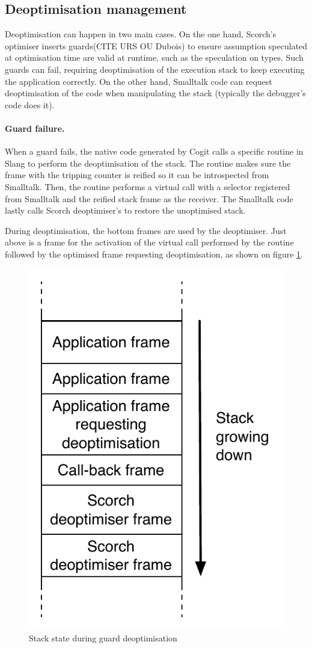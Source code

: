 \documentclass[a4paper,12pt,twoside]{../includes/ThesisStyle}
\begin{document}
\subsection{Deoptimisation management}

Deoptimisation can happen in two main cases. On the one hand, Scorch's optimiser inserts guards(CITE URS OU Dubois) to ensure assumption speculated at optimisation time are valid at runtime, such as the speculation on types. Such guards can fail, requiring deoptimisation of the execution stack to keep executing the application correctly. On the other hand, Smalltalk code can request deoptimisation of the code when manipulating the stack (typically the debugger's code does it).

\paragraph{Guard failure.} When a guard fails, the native code generated by Cogit calls a specific routine in Slang to perform the deoptimisation of the stack. The routine makes sure the frame with the tripping counter is reified so it can be introspected from Smalltalk. Then, the routine performs a virtual call with a selector registered from Smalltalk and the reified stack frame as the receiver. The Smalltalk code lastly calls Scorch deoptimiser's to restore the unoptimised stack.

During deoptimisation, the bottom frames are used by the deoptimiser. Just above is a frame for the activation of the virtual call performed by the routine followed by the optimised frame requesting deoptimisation, as shown on figure \ref{fig:DeoptCallBackStack}.

\begin{figure}[h!]
    \begin{center}
        \includegraphics[width=0.4\linewidth]{DeoptCallBackStack}
        \caption{Stack state during guard deoptimisation}
        \label{fig:DeoptCallBackStack}
    \end{center}
\end{figure}
\end{document}

